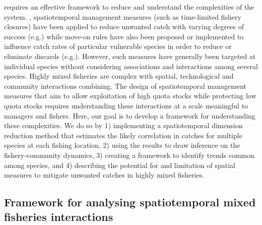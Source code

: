 \documentclass[fleqn,10pt]{wlscirep}
\begin{document}
\begin{linenumbers}
 requires an
effective framework to reduce and understand the complexities of the system.
, spatiotemporal management measures (such as
time-limited fishery closures) have been applied to reduce unwanted catch with
varying degrees of success (e.g.\cite{Needle2011, Holmes2011, Beare2010,
	Dinmore2003}) while move-on rules have also been proposed or
implemented to influence catch rates of particular vulnerable species in order
to reduce or eliminate discards (e.g.\cite{Gardner2008, Dunn2011, Dunn2014a}).
However, such measures have generally been targeted at individual species
without considering associations and interactions among several species. Highly
mixed fisheries are complex with spatial, technological and community
interactions combining. The design of spatiotemporal management measures that
aim to allow exploitation of high quota stocks while protecting low quota
stocks requires understanding these interactions at a scale meaningful to
managers and fishers. Here, our goal is to develop a framework for
understanding these complexities. We do so by 1) implementing a spatiotemporal
dimension reduction method that estimates the likely correlation in catches for
multiple species at each fishing location, 2) using the results to draw
inference on the fishery-community dynamics, 3) creating a framework to
identify trends common among species, and 4) describing the potential for and
limitation of spatial measures to mitigate unwanted catches in highly mixed
fisheries.\\

\subsection*{Framework for analysing spatiotemporal mixed fisheries
	interactions \\}


\end{linenumbers}
\end{document}
